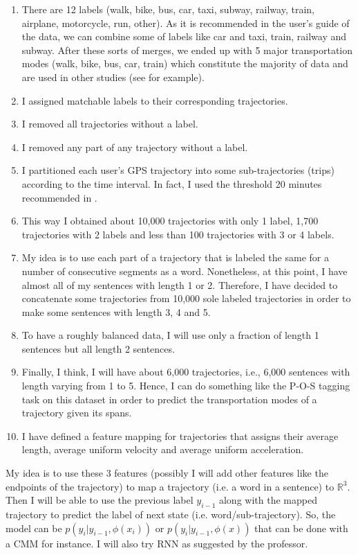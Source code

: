 \documentclass[11pt]{myclass}
\begin{document}
\begin{enumerate}
\item There are 12 labels (walk, bike, bus, car, taxi, subway, railway, train, airplane, motorcycle, run, other). As it is recommended in the user's guide of the data, we can combine some of labels like car and taxi, train, railway and subway. After these sorts of merges, we ended up with 5 major transportation modes (walk, bike, bus, car, train) which constitute the majority of data and are used in other studies (see \cite{DH2018} for example). 

\item  I assigned matchable labels to their corresponding trajectories. 

\item I removed all trajectories without a label.

\item I removed any part of any trajectory without a label.

\item I partitioned each user's GPS trajectory into some sub-trajectories (trips) according to the time interval. In fact, I used the threshold 20 minutes recommended in \cite{ZLWX}. 

\item This way I obtained about 10,000 trajectories with only 1 label, 1,700 trajectories with 2 labels and less than 100 trajectories with 3 or 4 labels. 

\item My idea is to use each part of a trajectory that is labeled the same for a number of consecutive segments as a word. Nonetheless, at this point, I have almost all of my sentences with length 1 or 2. Therefore, I have decided to concatenate some trajectories from 10,000 sole labeled trajectories in order to make some sentences with length 3, 4 and 5. 

\item To have a roughly balanced data, I will use only a fraction of length 1 sentences but all length 2 sentences. 

\item Finally, I think, I will have about 6,000 trajectories, i.e., 6,000 sentences with length varying from 1 to 5. Hence, I can do something like the P-O-S tagging task on this dataset in order to predict the transportation modes of a trajectory given its spans. 

\item I have defined a feature mapping for trajectories that assigns their average length, average uniform velocity and average uniform acceleration. 
\end{enumerate}

My idea is to use these 3 features (possibly I will add other features like the endpoints of the trajectory) to map a trajectory (i.e. a word in a sentence) to $\mathbb{R}^3$. Then I will be able to use the previous label $y_{i-1}$ along with the mapped trajectory to predict the label of next state (i.e. word/sub-trajectory). So, the model can be $p(y_i | y_{i-1}, \phi(x_i))$ or $p(y_i | y_{i-1}, \phi(x))$  that can be done with a CMM for instance. I will also try RNN as suggested by the professor. 



\end{document}
